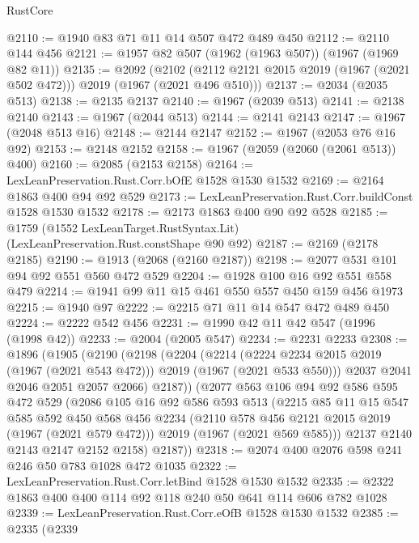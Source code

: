 \begin{lexlean}{RustCore}
\begin{coremodule}
@2110 := @1940 @83 @71 @11 @14 @507 @472 @489 @450
@2112 := @2110 @144 @456
@2121 := @1957 @82 @507 (@1962 (@1963 @507)) (@1967 (@1969 @82 @11))
@2135 := @2092
    (@2102 (@2112 @2121 @2015 @2019 (@1967 (@2021 @502 @472))) @2019 (@1967 (@2021 @496 @510)))
@2137 := @2034 (@2035 @513)
@2138 := @2135 @2137
@2140 := @1967 (@2039 @513)
@2141 := @2138 @2140
@2143 := @1967 (@2044 @513)
@2144 := @2141 @2143
@2147 := @1967 (@2048 @513 @16)
@2148 := @2144 @2147
@2152 := @1967 (@2053 @76 @16 @92)
@2153 := @2148 @2152
@2158 := @1967 (@2059 (@2060 (@2061 @513)) @400)
@2160 := @2085 (@2153 @2158)
@2164 := LexLeanPreservation.Rust.Corr.bOfE @1528 @1530 @1532
@2169 := @2164 @1863 @400 @94 @92 @529
@2173 := LexLeanPreservation.Rust.Corr.buildConst @1528 @1530 @1532
@2178 := @2173 @1863 @400 @90 @92 @528
@2185 := @1759 (@1552 LexLeanTarget.RustSyntax.Lit) (LexLeanPreservation.Rust.constShape @90 @92)
@2187 := @2169 (@2178 @2185)
@2190 := @1913 (@2068 (@2160 @2187))
@2198 := @2077 @531 @101 @94 @92 @551 @560 @472 @529
@2204 := @1928 @100 @16 @92 @551 @558 @479
@2214 := @1941 @99 @11 @15 @461 @550 @557 @450 @159 @456 @1973
@2215 := @1940 @97
@2222 := @2215 @71 @11 @14 @547 @472 @489 @450
@2224 := @2222 @542 @456
@2231 := @1990 @42 @11 @42 @547 (@1996 (@1998 @42))
@2233 := @2004 (@2005 @547)
@2234 := @2231 @2233
@2308 := @1896
    (@1905
      (@2190
        (@2198
          (@2204
            (@2214
              (@2224 @2234 @2015 @2019 (@1967 (@2021 @543 @472)))
              @2019
              (@1967 (@2021 @533 @550)))
            @2037
            @2041
            @2046
            @2051
            @2057
            @2066)
          @2187))
      (@2077
        @563
        @106
        @94
        @92
        @586
        @595
        @472
        @529
        (@2086
          @105
          @16
          @92
          @586
          @593
          @513
          (@2215
            @85
            @11
            @15
            @547
            @585
            @592
            @450
            @568
            @456
            @2234
            (@2110 @578 @456 @2121 @2015 @2019 (@1967 (@2021 @579 @472)))
            @2019
            (@1967 (@2021 @569 @585)))
          @2137
          @2140
          @2143
          @2147
          @2152
          @2158)
        @2187))
@2318 := @2074 @400 @2076 @598 @241 @246 @50 @783 @1028 @472 @1035
@2322 := LexLeanPreservation.Rust.Corr.letBind @1528 @1530 @1532
@2335 := @2322 @1863 @400 @400 @114 @92 @118 @240 @50 @641 @114 @606 @782 @1028
@2339 := LexLeanPreservation.Rust.Corr.eOfB @1528 @1530 @1532
@2385 := @2335
    (@2339

\end{coremodule}
\end{lexlean}
